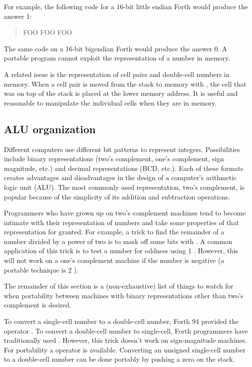 For example, the following code for a 16-bit little endian Forth
would produce the answer 1:
\begin{quote}\ttfamily
	 FOO
	 FOO \word{!}
	\quad FOO 
\end{quote}

The same code on a 16-bit bigendian Forth would produce the
answer 0. A portable program cannot exploit the representation
of a number in memory.

A related issue is the representation of cell pairs and double-cell
numbers in memory. When a cell pair is moved from the stack to memory
with , the cell that was on top of the stack is placed at the
lower memory address. It is useful and reasonable to manipulate the
individual cells when they are in memory.

\subsection{ALU organization} %

Different computers use different bit patterns to represent integers.
Possibilities include binary representations (two's complement, one's
complement, sign magnitude, etc.) and decimal representations (BCD,
etc.). Each of these formats creates advantages and disadvantages in
the design of a computer's arithmetic logic unit (ALU). The most
commonly used representation, two's complement, is popular because of
the simplicity of its addition and subtraction operations.

Programmers who have grown up on two's complement machines tend to
become intimate with their representation of numbers and take some
properties of that representation for granted. For example, a trick
to find the remainder of a number divided by a power of two is to mask
off some bits with . A common application of this trick is
to test a number for oddness using 1 . However, this will
not work on a one's complement machine if the number is negative (a
portable technique is 2 ).

The remainder of this section is a (non-exhaustive) list of things to
watch for when portability between machines with binary representations
other than two's complement is desired.

To convert a single-cell number to a double-cell number, Forth 94
provided the operator . To convert a double-cell number to
single-cell, Forth programmers have traditionally used .
However, this trick doesn't work on sign-magnitude machines. For
portability a  operator is available. Converting an
unsigned single-cell number to a double-cell number can be done portably
by pushing a zero on the stack.


